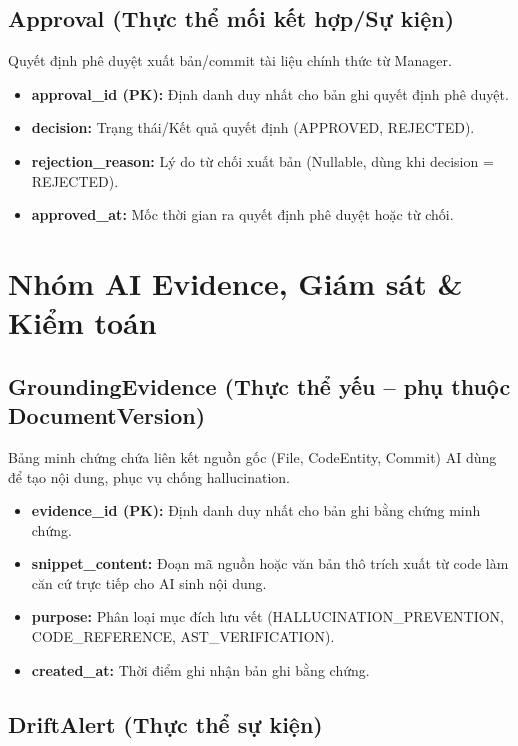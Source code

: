 \subsection{Approval (Thực thể mối kết hợp/Sự kiện)}

Quyết định phê duyệt xuất bản/commit tài liệu chính thức từ Manager.

\begin{itemize}
    \item \textbf{approval\_id (PK):} Định danh duy nhất cho bản ghi quyết định phê duyệt.
    \item \textbf{decision:} Trạng thái/Kết quả quyết định (APPROVED, REJECTED).
    \item \textbf{rejection\_reason:} Lý do từ chối xuất bản (Nullable, dùng khi decision = REJECTED).
    \item \textbf{approved\_at:} Mốc thời gian ra quyết định phê duyệt hoặc từ chối.
\end{itemize}


\section{Nhóm AI Evidence, Giám sát \& Kiểm toán}

\subsection{GroundingEvidence (Thực thể yếu -- phụ thuộc DocumentVersion)}

Bảng minh chứng chứa liên kết nguồn gốc (File, CodeEntity, Commit) AI dùng để tạo nội dung, phục vụ chống hallucination.

\begin{itemize}
    \item \textbf{evidence\_id (PK):} Định danh duy nhất cho bản ghi bằng chứng minh chứng.
    \item \textbf{snippet\_content:} Đoạn mã nguồn hoặc văn bản thô trích xuất từ code làm căn cứ trực tiếp cho AI sinh nội dung.
    \item \textbf{purpose:} Phân loại mục đích lưu vết (HALLUCINATION\_PREVENTION, CODE\_REFERENCE, AST\_VERIFICATION).
    \item \textbf{created\_at:} Thời điểm ghi nhận bản ghi bằng chứng.
\end{itemize}


\subsection{DriftAlert (Thực thể sự kiện)}

